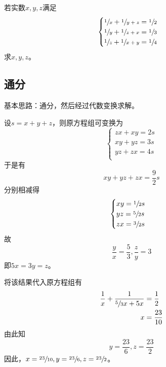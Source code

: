 

若实数$x, y, z$满足
\[ \begin{cases}
  \sfrac1x + \sfrac1{y + z} = \sfrac12 \\
  \sfrac1y + \sfrac1{z + x} = \sfrac13 \\
  \sfrac1z + \sfrac1{x + y} = \sfrac14 \\  
\end{cases} \]
求$x, y, z$。


\subsection{通分}

基本思路：通分，然后经过代数变换求解。

设$s = x + y + z$，则原方程组可变换为
\[ \begin{cases}
  zx + xy = 2s \\
  xy + yz = 3s \\
  yz + zx = 4s \\
\end{cases} \]
于是有
\[ xy + yz + zx = \frac92s \]
分别相减得
\[ \begin{cases}
  xy = \sfrac12s \\
  yz = \sfrac52s \\
  zx = \sfrac32s \\
\end{cases} \]
故
\[ \frac yx = \frac53, \frac zy = 3 \]
即$5x = 3y = z$。

将该结果代入原方程组有
\begin{align*}
  \frac1x + \frac1{\sfrac53x + 5x} &= \frac12 \\
  x &= \frac{23}{10} \\
\end{align*}
由此知
\[ y = \frac{23}6, z = \frac{23}2 \]
因此，$x = \sfrac{23}{10}, y = \sfrac{23}6, z = \sfrac{23}2$。

